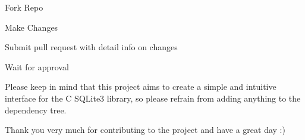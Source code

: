 
\begin{DoxyEnumerate}
\item Fork Repo
\item Make Changes
\item Submit pull request with detail info on changes
\item Wait for approval
\end{DoxyEnumerate}

Please keep in mind that this project aims to create a simple and intuitive interface for the C S\+Q\+Lite3 library, so please refrain from adding anything to the dependency tree.

Thank you very much for contributing to the project and have a great day \+:) 